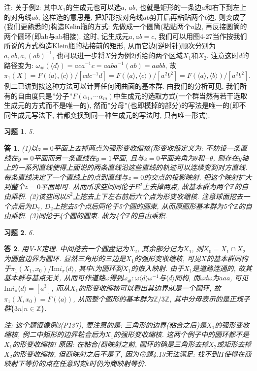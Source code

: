 \documentclass{ctexart}%
\newtheorem*{exercise}{习题}
\newtheorem*{solution}{答}
\theoremstyle{definition}
\theoremstyle{remark}
\begin{document}
注: 关于例2: 其中$X_1$的生成元也可以选$a$, $ab$, 也就是矩形的一条边$a$和右下到左上的对角线$ab$, 这样选的意思是, 把矩形按对角线$ab$剪开后再粘贴两个$b$边, 则变成了(我们更熟悉的)构造Kelin瓶的方式: 先做成一个圆筒(粘贴两个$a$边, 再反接圆筒的两个圆环(即ab与ab相接). 这时, 记生成元$a,ab=c$,  我们可以用图4-27当作按我们所说的方式构造Klein瓶的粘接前的矩形, 从而它边(逆时针)顺次分别为$a,ab,a, (ab)^{-1}$, 也可以进一步将$X$分为例2所给的两个区域$X_1$和$X_2$. 注意这时$d$的路径变为: $\omega_\#(\langle d\rangle)=aca^{-1}c=aaba^{-1}(ab)=aabb$, 故$\pi_1(X)=F(\langle 
a\rangle,\langle c\rangle )/[cdc^{-1}d]=F(\langle a\rangle,\langle c\rangle)/[a^2b^2]=F(\langle a\rangle, \langle b\rangle)/[a^2b^2]$.
例二已讲到按这种方法可以计算任何闭曲面的基本群. 由我们的分析可见, 我们所有的自由度只是''分子''$F(\alpha_1,\cdots\alpha_m)$中生成元的选取方式(一个群当然有若干选取生成元的方式而不是唯一的), 然而''分母''(也即模掉的部分)的写法是唯一的(即不同生成元写法下, 若都变换到同一种生成元的写法时, 只有唯一形式). 

\begin{exercise}5.
\end{exercise}
\begin{solution}
(1)以$z=0$平面上去掉两点为强形变收缩核(形变收缩定义为: 不妨设一条直线在$y=0$平面而另一条直线在$y=1$平面, 且与$z=0$平面夹角为$\theta$和$-\theta$, 则存在$y$轴上的一系列直线使得上面说的两条直线沿这些直线的轨迹可以连续变到对方直线. 每条直线决定了一个直线上的点到直线与$z=0$的交点的投影映射. 把这个映射扩大到整个$z=0$平面即可. 从而所求空间同伦于$E^2$上去掉两点, 故基本群为两个$\mathbb{Z}$的自由乘积. (2)该空间以$S^2$上挖去上下左右前后六个点为形变收缩核. 注意球面挖去一个点后为$D_2$, $D_2$上挖去5个点后同伦于5个圆的圆束, 从而原图形基本群为5个$\mathbb{Z}$的自由乘积. (3)同伦于4个圆的圆束. 故为4个$\mathbb{Z}$的自由乘积. 
\end{solution}

\begin{exercise}6.
\end{exercise}
\begin{solution}
用V-K定理. 中间挖去一个圆盘记为$X_2$, 其余部分记为$X_1$, 则$X_0=X_1\cap X_2$为圆盘边界为圆环. 显然三角形的三边是$X_1$的强形变收缩核, 可见$X$的基本群同构于$\pi_1(X_1,x_0)/\text{Im} i_{\pi} \langle d\rangle$, 其中$i$为圆环到$X_1$的嵌入映射. 由于$X_1$是道路连通的, 故其基本群与基点无关, 从而可作道路$\omega$得到$\omega_\#: \omega \langle d\rangle \omega^{-1}$与$\langle d\rangle$同构, 而$\omega d\omega$为$aaa$, 可见$\text{Im} i_\pi \langle d\rangle = [a^3]$, 而从$X_1$的形变收缩核可以看出其边界就是一个圆环, 故$\pi_1(X,x_0)=F(\langle a\rangle)$, 从而整个图形的基本群为$\mathbb{Z}/3\mathbb{Z}$, 其中分母表示的是正规子群$\{3n|n\in \mathbb{Z}\}$. 

注: 这个题很像例2(P137), 要注意的是: 三角形的边界(粘合之后)是$X_1$的强形变收缩核, 例二中矩形的边界粘合后为$X_1$的强形变收缩核. 这两个例子中的圆环都不是$X_1$的形变收缩核! 原因: 在粘合(商映射之前, 圆环的确是三角形去掉$X_2$或矩形去掉$X_2$的形变收缩核, 但商映射之后不是了, 因为命题4.13无法满足: 找不到$H$使得在商映射下等价的点在任意时刻$t$时仍为商映射等价. 
\end{solution}
\end{document}
